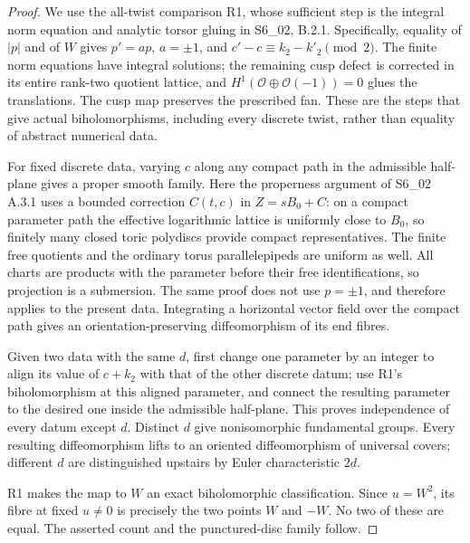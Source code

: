 \begin{proof}
We use the all-twist comparison R1, whose sufficient step is the
integral norm equation and analytic torsor gluing in S6\_02,
B.2.1. Specifically, equality of $|p|$ and of $W$ gives
$p'=ap$, $a=\pm1$, and $c'-c\equiv k_2-k'_2\pmod2$.
The finite norm equations have integral solutions; the remaining
cusp defect is corrected in its entire rank-two quotient lattice,
and $H^1(\mathcal O\oplus\mathcal O(-1))=0$ glues the translations.
The cusp map preserves the prescribed fan. These are the steps that
give actual biholomorphisms, including every discrete twist, rather
than equality of abstract numerical data.

For fixed discrete data, varying $c$ along any compact path in the
admissible half-plane gives a proper smooth family. Here the
properness argument of S6\_02 A.3.1 uses a bounded correction
$C(t,c)$ in $Z=sB_0+C$: on a compact parameter path the effective
logarithmic lattice is uniformly close to $B_0$, so finitely many
closed toric polydiscs provide compact representatives. The finite
free quotients and the ordinary torus parallelepipeds are uniform
as well. All charts are products with the parameter before their
free identifications, so projection is a submersion. The same proof
does not use $p=\pm1$, and therefore applies to the present data.
Integrating a horizontal vector field over the compact path gives
an orientation-preserving diffeomorphism of its end fibres.

Given two data with the same $d$, first change one parameter by an
integer to align its value of $c+k_2$ with that of the other
discrete datum; use R1's biholomorphism at this aligned parameter,
and connect the resulting parameter to the desired one inside the
admissible half-plane. This proves independence of every datum
except $d$. Distinct $d$ give nonisomorphic fundamental groups.
Every resulting diffeomorphism lifts to an oriented diffeomorphism
of universal covers; different $d$ are distinguished upstairs by
Euler characteristic $2d$.

R1 makes the map to $W$ an exact biholomorphic classification.
Since $u=W^2$, its fibre at fixed $u\ne0$ is precisely the two
points $W$ and $-W$. No two of these are equal. The asserted count
and the punctured-disc family follow.
\end{proof}

